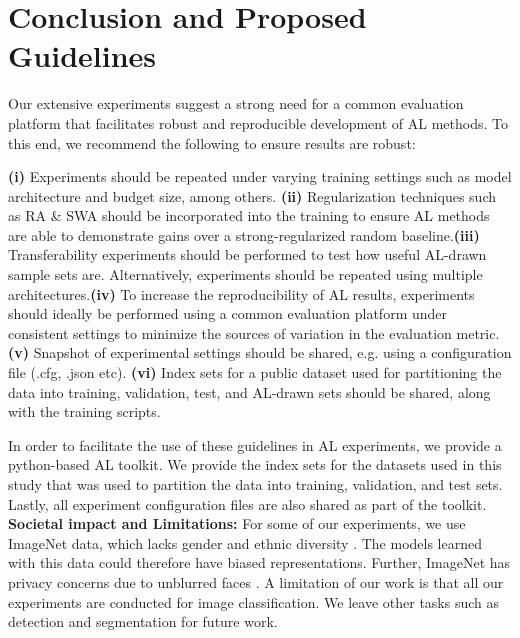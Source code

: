 \documentclass[10pt,twocolumn,letterpaper]{article}
\begin{document}
\section{Conclusion and Proposed Guidelines}
Our extensive experiments suggest a strong need for a common evaluation platform that facilitates robust and reproducible development of AL methods. To this end, we recommend the following to ensure results are robust: 

\textbf{(i)} Experiments should be repeated under varying training settings such as model architecture and budget size, among others. \textbf{(ii)} Regularization techniques such as RA \& SWA should be incorporated into the training to ensure AL methods are able to demonstrate gains over a strong-regularized random baseline.\textbf{(iii)} Transferability experiments should be performed to test how useful AL-drawn sample sets are. Alternatively, experiments should be repeated using multiple architectures.\textbf{(iv)} To increase the reproducibility of AL results, experiments should ideally be performed using a common evaluation platform under consistent settings to minimize the sources of variation in the evaluation metric. \textbf{(v)} Snapshot of experimental settings should be shared, e.g. using a configuration file (.cfg, .json etc). \textbf{(vi)} Index sets for a public dataset used for partitioning the data into training, validation, test, and AL-drawn sets should be shared, along with the training scripts. 

\noindent In order to facilitate the use of these guidelines in AL experiments, we provide a python-based AL toolkit. We provide the index sets for the datasets used in this study that was used to partition the data into training, validation, and test sets. Lastly, all experiment configuration files are also shared as part of the toolkit.  \\   

\noindent \textbf{Societal impact and Limitations:} For some of our experiments, we use ImageNet data, which lacks gender and ethnic diversity \cite{yang2019fairer}. The models learned with this data could therefore have biased representations. Further, ImageNet has privacy concerns due to unblurred faces \cite{yang2021study}. A limitation of our work is that all our experiments are conducted for image classification. We leave other tasks such as detection and segmentation for future work.



{\small


}
\end{document}
